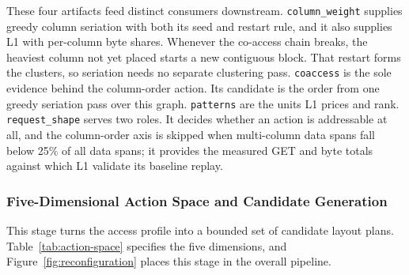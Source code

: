 These four artifacts feed distinct consumers downstream. %
\texttt{column\_weight} supplies greedy column seriation with both its seed and restart rule, and it also supplies L1 with per-column byte shares. Whenever the co-access chain breaks, the heaviest column not yet placed starts a new contiguous block. That restart forms the clusters, so seriation needs no separate clustering pass.
\texttt{coaccess} is the sole evidence behind the column-order action. Its candidate is the order from one greedy seriation pass over this graph. \texttt{patterns} are the units L1 prices and rank. \texttt{request\_shape} serves two roles.%
It decides whether an action is addressable at all, and the column-order axis is skipped when multi-column data spans fall below 25\% of all data spans; it provides the measured GET and byte totals against which L1 validate its baseline replay.

\subsubsection{Five-Dimensional Action Space and Candidate Generation}
\label{sec:action-space}
This stage turns the access profile into a bounded set of candidate layout plans. Table~\ref{tab:action-space} specifies the five dimensions, and Figure~\ref{fig:reconfiguration} places this stage in the overall pipeline.

